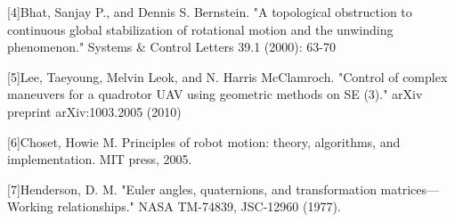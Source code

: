 \documentclass{article}
\begin{document}
 [4]Bhat, Sanjay P., and Dennis S. Bernstein. "A topological obstruction to continuous global stabilization of rotational motion and the unwinding phenomenon." Systems \& Control Letters 39.1 (2000): 63-70
 
 [5]Lee, Taeyoung, Melvin Leok, and N. Harris McClamroch. "Control of complex maneuvers for a quadrotor UAV using geometric methods on SE (3)." arXiv preprint arXiv:1003.2005 (2010)
 
 [6]Choset, Howie M. Principles of robot motion: theory, algorithms, and implementation. MIT press, 2005.
 
 [7]Henderson, D. M. "Euler angles, quaternions, and transformation matrices—Working relationships." NASA TM-74839, JSC-12960 (1977).
   
	
\end{document}
